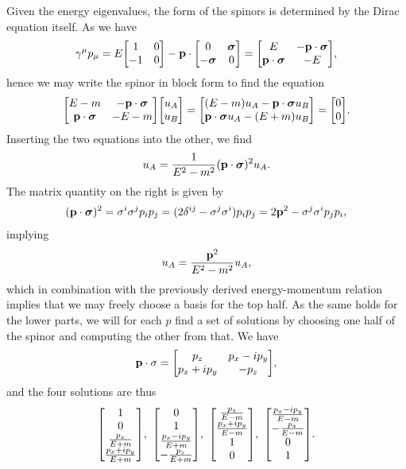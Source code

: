 Given the energy eigenvalues, the form of the spinors is determined by the Dirac equation itself. As we have
\begin{align*}
	\gamma^{\mu}p_{\mu} = E\mqty[
		1  & 0 \\
		-1 & 0
	] - \vb{p}\cdot\mqty[
		0             & \vb*{\sigma} \\
		-\vb*{\sigma} & 0
	] = \mqty[
	E                       & -\vb{p}\cdot\vb*{\sigma} \\
	\vb{p}\cdot\vb*{\sigma} & -E
	],
\end{align*}
hence we may write the spinor in block form to find the equation
\begin{align*}
	\mqty[
		E - m                   & -\vb{p}\cdot\vb*{\sigma} \\
		\vb{p}\cdot\vb*{\sigma} & -E - m
	]\mqty[
		u_{A} \\
		u_{B}
	] = 
	\mqty[
		(E - m)u_{A} - \vb{p}\cdot\vb*{\sigma}u_{B} \\
		\vb{p}\cdot\vb*{\sigma}u_{A} - (E + m)u_{B}
	] = \mqty[
		0 \\
		0
	].
\end{align*}
Inserting the two equations into the other, we find
\begin{align*}
	u_{A} = \frac{1}{E^{2} - m^{2}}(\vb{p}\cdot\vb*{\sigma})^{2}u_{A}.
\end{align*}
The matrix quantity on the right is given by
\begin{align*}
	(\vb{p}\cdot\vb*{\sigma})^{2} = \sigma^{i}\sigma^{j}p_{i}p_{j} = (2\delta^{ij} - \sigma^{j}\sigma^{i})p_{i}p_{j} = 2\vb{p}^{2} - \sigma^{j}\sigma^{i}p_{j}p_{i},
\end{align*}
implying
\begin{align*}
	u_{A} = \frac{\vb{p}^{2}}{E^{2} - m^{2}}u_{A},
\end{align*}
which in combination with the previously derived energy-momentum relation implies that we may freely choose a basis for the top half. As the same holds for the lower parts, we will for each $p$ find a set of solutions by choosing one half of the spinor and computing the other from that. We have
\begin{align*}
	\vb{p}\cdot\vb{\sigma} = \mqty[
		p_{z}          & p_{x} - ip_{y} \\
		p_{x} + ip_{y} & -p_{z}
	],
\end{align*}
and the four solutions are thus
\begin{align*}
	\mqty[
		1 \\
		0 \\
		\frac{p_{z}}{E + m} \\
		\frac{p_{x} + ip_{y}}{E + m}
	],\ \mqty[
		0 \\
		1 \\
		\frac{p_{x} - ip_{y}}{E + m} \\
		-\frac{p_{z}}{E + m}
	],\ \mqty[
		\frac{p_{z}}{E - m} \\
		\frac{p_{x} + ip_{y}}{E - m} \\
		1 \\
		0
	],\ \mqty[
		\frac{p_{x} - ip_{y}}{E - m} \\
		-\frac{p_{z}}{E - m} \\
		0 \\
		1
	].
\end{align*}
